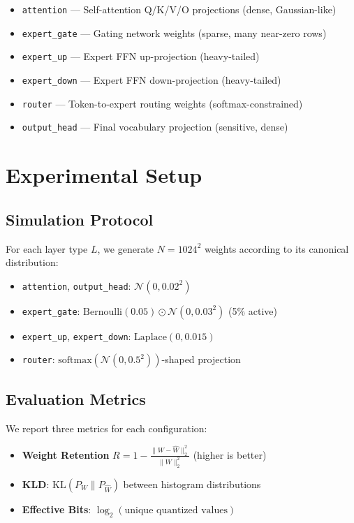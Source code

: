 \begin{itemize}
\item \texttt{attention} — Self-attention Q/K/V/O projections (dense, Gaussian-like)
\item \texttt{expert\_gate} — Gating network weights (sparse, many near-zero rows)
\item \texttt{expert\_up} — Expert FFN up-projection (heavy-tailed)
\item \texttt{expert\_down} — Expert FFN down-projection (heavy-tailed)
\item \texttt{router} — Token-to-expert routing weights (softmax-constrained)
\item \texttt{output\_head} — Final vocabulary projection (sensitive, dense)
\end{itemize}

\section{Experimental Setup}

\subsection{Simulation Protocol}

For each layer type $L$, we generate $N = 1024^2$ weights according to its
canonical distribution:

\begin{itemize}
\item \texttt{attention}, \texttt{output\_head}: $\mathcal{N}(0, 0.02^2)$
\item \texttt{expert\_gate}: $\text{Bernoulli}(0.05) \odot \mathcal{N}(0, 0.03^2)$ (5\% active)
\item \texttt{expert\_up}, \texttt{expert\_down}: $\text{Laplace}(0, 0.015)$
\item \texttt{router}: $\text{softmax}(\mathcal{N}(0, 0.5^2))$-shaped projection
\end{itemize}

\subsection{Evaluation Metrics}

We report three metrics for each configuration:

\begin{itemize}
\item \textbf{Weight Retention} $R = 1 - \frac{\|W - \hat{W}\|_2^2}{\|W\|_2^2}$ (higher is better)
\item \textbf{KLD}: $\text{KL}(P_W \| P_{\hat{W}})$ between histogram distributions
\item \textbf{Effective Bits}: $\log_2(\text{unique quantized values})$
\end{itemize}

